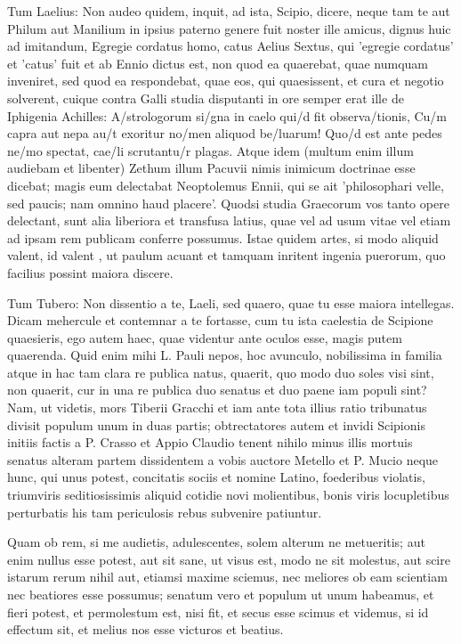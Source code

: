  Tum Laelius: Non audeo quidem, inquit, ad ista, Scipio, dicere, neque tam te aut Philum aut Manilium in ipsius paterno genere fuit noster ille amicus, dignus huic ad imitandum, Egregie cordatus homo, catus Aelius Sextus, qui 'egregie cordatus' et 'catus' fuit et ab Ennio dictus est, non quod ea quaerebat, quae numquam inveniret, sed quod ea respondebat, quae eos, qui quaesissent, et cura et negotio solverent, cuique contra Galli studia disputanti in ore semper erat ille de Iphigenia Achilles: A/strologorum si/gna in caelo qui/d fit observa/tionis, Cu/m capra aut nepa au/t exoritur no/men aliquod be/luarum! Quo/d est ante pedes ne/mo spectat, cae/li scrutantu/r plagas. Atque idem (multum enim illum audiebam et libenter) Zethum illum Pacuvii nimis inimicum doctrinae esse dicebat; magis eum delectabat Neoptolemus Ennii, qui se ait 'philosophari velle, sed paucis; nam omnino haud placere'. Quodsi studia Graecorum vos tanto opere delectant, sunt alia liberiora et transfusa latius, quae vel ad usum vitae vel etiam ad ipsam rem publicam conferre possumus. Istae quidem artes, si modo aliquid valent, id valent , ut paulum acuant et tamquam inritent ingenia puerorum, quo facilius possint maiora discere.

 Tum Tubero: Non dissentio a te, Laeli, sed quaero, quae tu esse maiora intellegas. Dicam mehercule et contemnar a te fortasse, cum tu ista caelestia de Scipione quaesieris, ego autem haec, quae videntur ante oculos esse, magis putem quaerenda. Quid enim mihi L. Pauli nepos, hoc avunculo, nobilissima in familia atque in hac tam clara re publica natus, quaerit, quo modo duo soles visi sint, non quaerit, cur in una re publica duo senatus et duo paene iam populi sint? Nam, ut videtis, mors Tiberii Gracchi et iam ante tota illius ratio tribunatus divisit populum unum in duas partis; obtrectatores autem et invidi Scipionis initiis factis a P. Crasso et Appio Claudio tenent nihilo minus illis mortuis senatus alteram partem dissidentem a vobis auctore Metello et P. Mucio neque hunc, qui unus potest, concitatis sociis et nomine Latino, foederibus violatis, triumviris seditiosissimis aliquid cotidie novi molientibus, bonis viris locupletibus perturbatis his tam periculosis rebus subvenire patiuntur.

 Quam ob rem, si me audietis, adulescentes, solem alterum ne metueritis; aut enim nullus esse potest, aut sit sane, ut visus est, modo ne sit molestus, aut scire istarum rerum nihil aut, etiamsi maxime sciemus, nec meliores ob eam scientiam nec beatiores esse possumus; senatum vero et populum ut unum habeamus, et fieri potest, et permolestum est, nisi fit, et secus esse scimus et videmus, si id effectum sit, et melius nos esse victuros et beatius.

